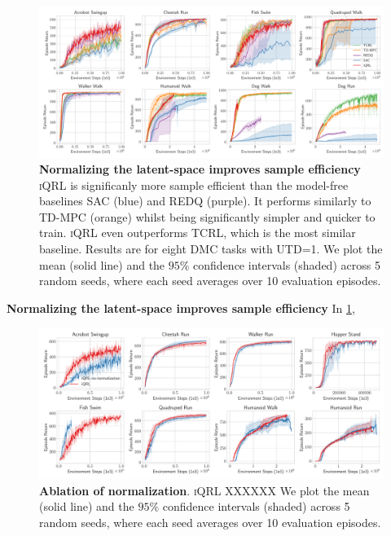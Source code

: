 \documentclass{article}
\theoremstyle{plain}
\theoremstyle{definition}
\theoremstyle{remark}
\newcommand{\our}{\textsc{iQRL}\xspace}
\begin{document}
\begin{figure}[ht]
\vskip 0.2in
\begin{center}
\centerline{\includegraphics[width=1.0\textwidth]{./figs/baselines_comparison.pdf}}
\caption{\textbf{Normalizing the latent-space improves sample efficiency} \our is significanly more sample efficient than the model-free baselines SAC (blue) and REDQ (purple). It performs similarly to TD-MPC (orange) whilst being significantly simpler and quicker to train. \our even outperforms TCRL, which is the most similar baseline. Results are for eight DMC tasks with UTD=1. We plot the mean (solid line) and the $95\%$ confidence intervals (shaded) across 5 random seeds, where each seed averages over 10 evaluation episodes.}
\label{fig:normalization_improves_sample_efficiency}
\end{center}
\vskip -0.2in
\end{figure}

\textbf{Normalizing the latent-space improves sample efficiency}
In \cref{fig:normalization_improves_sample_efficiency},



\begin{figure}[ht]
\vskip 0.2in
\begin{center}
\centerline{\includegraphics[width=1.0\textwidth]{./figs/normalization-ablation.pdf}}
\caption{\textbf{Ablation of normalization}. \our XXXXXX We plot the mean (solid line) and the $95\%$ confidence intervals (shaded) across 5 random seeds, where each seed averages over 10 evaluation episodes.}
\label{fig:normalization-ablation}
\end{center}
\vskip -0.2in
\end{figure}
\end{document}

